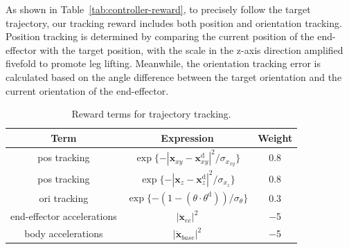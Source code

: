 As shown in Table~\ref{tab:controller-reward}, to precisely follow the target trajectory, our tracking reward includes both position and orientation tracking. Position tracking is determined by comparing the current position of the end-effector with the target position, with the scale in the z-axis direction amplified fivefold to promote leg lifting. Meanwhile, the orientation tracking error is calculated based on the angle difference between the target orientation and the current orientation of the end-effector.
\begin{table}[]
    \scriptsize
    \centering
    \caption{Reward terms for trajectory tracking.}%
    \begin{tabular}{ccc}
    \toprule
    \textbf{Term} & \textbf{Expression} & \textbf{Weight} \\
    \midrule
    pos tracking & \( \exp\{{-{|\textbf{x}_{xy}-\textbf{x}^{\text{d}}_{xy}|^2} / {\sigma_{x_{xy}}}}\}\) & \num{0.8} \\
    pos tracking & \( \exp\{{-{|\textbf{x}_{z}-\textbf{x}^{\text{d}}_{z}|^2} / {\sigma_{x_z}}}\}\) & \num{0.8} \\
    ori tracking & \( \exp\{{-(1-(\theta \cdot\theta^{\text{d}})) / {\sigma_{\theta}}}\}\) & \num{0.3} \\
    end-effector accelerations & $\left|\ddot{\textbf{x}}_{ee} \right|^{2}$ & \num{-5} \\
    body accelerations & $\left|\ddot{\textbf{x}}_{base} \right|^{2}$ & \num{-5} \\

\end{tabular}
\end{table}
